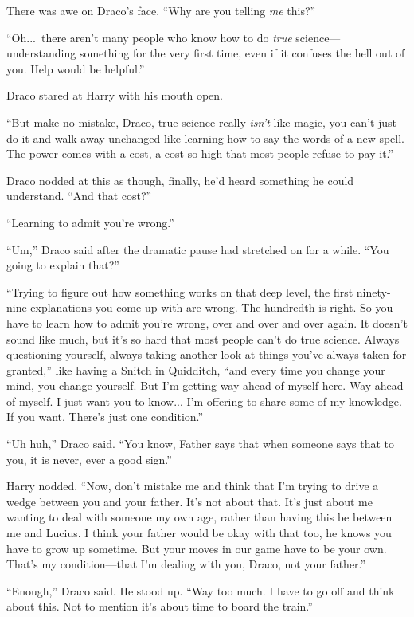 There was awe on Draco’s face. “Why are you telling \emph{me} this?”

“Oh...\ there aren’t many people who know how to do \emph{true} science—understanding something for the very first time, even if it confuses the hell out of you. Help would be helpful.”

Draco stared at Harry with his mouth open.

“But make no mistake, Draco, true science really \emph{isn’t} like magic, you can’t just do it and walk away unchanged like learning how to say the words of a new spell. The power comes with a cost, a cost so high that most people refuse to pay it.”

Draco nodded at this as though, finally, he’d heard something he could understand. “And that cost?”

“Learning to admit you’re wrong.”

“Um,” Draco said after the dramatic pause had stretched on for a while. “You going to explain that?”

“Trying to figure out how something works on that deep level, the first ninety-nine explanations you come up with are wrong. The hundredth is right. So you have to learn how to admit you’re wrong, over and over and over again. It doesn’t sound like much, but it’s so hard that most people can’t do true science. Always questioning yourself, always taking another look at things you’ve always taken for granted,” like having a Snitch in Quidditch, “and every time you change your mind, you change yourself. But I’m getting way ahead of myself here. Way ahead of myself. I just want you to know... I’m offering to share some of my knowledge. If you want. There’s just one condition.”

“Uh huh,” Draco said. “You know, Father says that when someone says that to you, it is never, ever a good sign.”

Harry nodded. “Now, don’t mistake me and think that I’m trying to drive a wedge between you and your father. It’s not about that. It’s just about me wanting to deal with someone my own age, rather than having this be between me and Lucius. I think your father would be okay with that too, he knows you have to grow up sometime. But your moves in our game have to be your own. That’s my condition—that I’m dealing with you, Draco, not your father.”

“Enough,” Draco said. He stood up. “Way too much. I have to go off and think about this. Not to mention it’s about time to board the train.”

